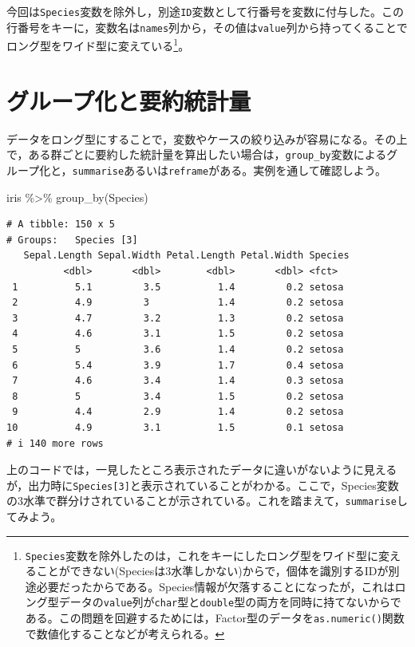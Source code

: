 \documentclass[
  a4paper,
]{ltjsbook}
\newenvironment{Shaded}{\begin{snugshade}}{\end{snugshade}}
\newcommand{\FunctionTok}[1]{\textcolor[rgb]{0.28,0.35,0.67}{#1}}
\newcommand{\NormalTok}[1]{\textcolor[rgb]{0.00,0.23,0.31}{#1}}
\newcommand{\SpecialCharTok}[1]{\textcolor[rgb]{0.37,0.37,0.37}{#1}}
\begin{document}
今回は\texttt{Species}変数を除外し，別途\texttt{ID}変数として行番号を変数に付与した。この行番号をキーに，変数名は\texttt{names}列から，その値は\texttt{value}列から持ってくることでロング型をワイド型に変えている\footnote{\texttt{Species}変数を除外したのは，これをキーにしたロング型をワイド型に変えることができない(Speciesは3水準しかない)からで，個体を識別するIDが別途必要だったからである。Species情報が欠落することになったが，これはロング型データの\texttt{value}列が\texttt{char}型と\texttt{double}型の両方を同時に持てないからである。この問題を回避するためには，Factor型のデータを\texttt{as.numeric()}関数で数値化することなどが考えられる。}。

\section{グループ化と要約統計量}\label{ux30b0ux30ebux30fcux30d7ux5316ux3068ux8981ux7d04ux7d71ux8a08ux91cf}

データをロング型にすることで，変数やケースの絞り込みが容易になる。その上で，ある群ごとに要約した統計量を算出したい場合は，\texttt{group\_by}変数によるグループ化と，\texttt{summarise}あるいは\texttt{reframe}がある。実例を通して確認しよう。

\begin{Shaded}
\begin{Highlighting}[]
\NormalTok{iris }\SpecialCharTok{\%\textgreater{}\%} \FunctionTok{group\_by}\NormalTok{(Species)}
\end{Highlighting}
\end{Shaded}

\begin{verbatim}
# A tibble: 150 x 5
# Groups:   Species [3]
   Sepal.Length Sepal.Width Petal.Length Petal.Width Species
          <dbl>       <dbl>        <dbl>       <dbl> <fct>  
 1          5.1         3.5          1.4         0.2 setosa 
 2          4.9         3            1.4         0.2 setosa 
 3          4.7         3.2          1.3         0.2 setosa 
 4          4.6         3.1          1.5         0.2 setosa 
 5          5           3.6          1.4         0.2 setosa 
 6          5.4         3.9          1.7         0.4 setosa 
 7          4.6         3.4          1.4         0.3 setosa 
 8          5           3.4          1.5         0.2 setosa 
 9          4.4         2.9          1.4         0.2 setosa 
10          4.9         3.1          1.5         0.1 setosa 
# i 140 more rows
\end{verbatim}

上のコードでは，一見したところ表示されたデータに違いがないように見えるが，出力時に\texttt{Species{[}3{]}}と表示されていることがわかる。ここで，Species変数の3水準で群分けされていることが示されている。これを踏まえて，\texttt{summarise}してみよう。
\end{document}
